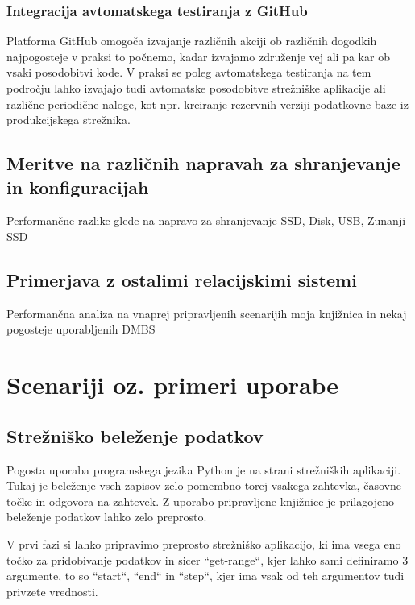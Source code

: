 \documentclass[a4paper,12pt,openright]{book}
\begin{document}
   \subsection{Integracija avtomatskega testiranja z GitHub}

   Platforma GitHub omogoča izvajanje različnih akciji ob različnih dogodkih najpogosteje v praksi to počnemo, kadar izvajamo združenje vej ali pa kar ob vsaki posodobitvi kode. V praksi se poleg avtomatskega testiranja na tem področju lahko izvajajo tudi avtomatske posodobitve strežniške aplikacije ali različne periodične naloge, kot npr. kreiranje rezervnih verziji podatkovne baze iz produkcijskega strežnika.
   
   \section{Meritve na različnih napravah za shranjevanje in konfiguracijah}
   \colorbox{BurntOrange}{Performančne razlike glede na napravo za shranjevanje}
   \newline
   \colorbox{BurntOrange}{SSD, Disk, USB, Zunanji SSD}
   
   \section{Primerjava z ostalimi relacijskimi sistemi}
   \colorbox{BurntOrange}{Performančna analiza na vnaprej pripravljenih scenarijih}
   \newline
   \colorbox{BurntOrange}{moja knjižnica in nekaj pogosteje uporabljenih DMBS}
    
\chapter{Scenariji oz. primeri uporabe}
\label{ch3}
    \section{Strežniško beleženje podatkov}

    Pogosta uporaba programskega jezika Python je na strani strežniških aplikaciji. Tukaj je beleženje vseh zapisov zelo pomembno torej vsakega zahtevka, časovne točke in odgovora na zahtevek. Z uporabo pripravljene knjižnice je prilagojeno beleženje podatkov lahko zelo preprosto.

    V prvi fazi si lahko pripravimo preprosto strežniško aplikacijo, ki ima vsega eno točko za pridobivanje podatkov in sicer ``get-range``, kjer lahko sami definiramo 3 argumente, to so ``start``, ``end`` in ``step``, kjer ima vsak od teh argumentov tudi privzete vrednosti.
\end{document}
